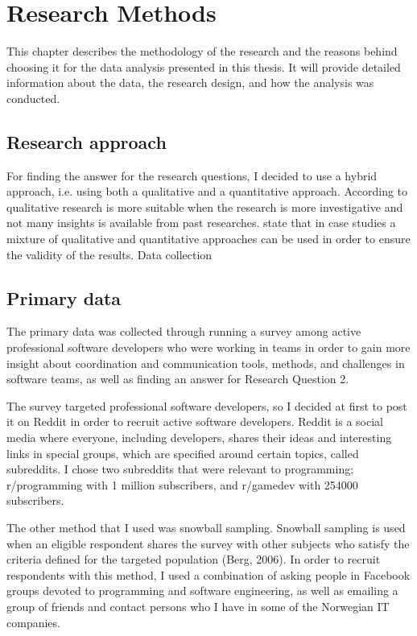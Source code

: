 \chapter{Research Methods}

This chapter describes the methodology of the research and the reasons behind choosing it for the data analysis presented in this thesis. It will provide detailed information about the data, the research design, and how the analysis was conducted.

\section{Research approach} 
For finding the answer for the research questions, I decided to use a hybrid approach, i.e. using both a qualitative and a quantitative approach. According to \citet{Ghauri2010} qualitative research is more suitable when the research is more investigative and not many insights is available from past researches. 
\citet{ Stray2012a} state that in case studies a mixture of qualitative and quantitative approaches can be used in order to ensure the validity of the results.  
Data collection

\section{Primary data}
The primary data was collected through running a survey among active professional software developers who were working in teams in order to gain more insight about coordination and communication tools, methods, and challenges in software teams, as well as finding an answer for Research Question 2.

The survey targeted professional software developers, so I decided at first to post it on Reddit in order to recruit active software developers. Reddit is a social media where everyone, including developers, shares their ideas and interesting links in special groups, which are specified around certain topics, called subreddits. I chose two subreddits that were relevant to programming; r/programming with 1 million subscribers, and r/gamedev with 254000 subscribers.

The other method that I used was snowball sampling. Snowball sampling is used when an eligible respondent shares the survey with other subjects who satisfy the criteria defined for the targeted population (Berg, 2006). In order to recruit respondents with this method, I used a combination of asking people in Facebook groups devoted to programming and software engineering, as well as emailing a group of friends and contact persons who I have in some of the Norwegian IT companies.

